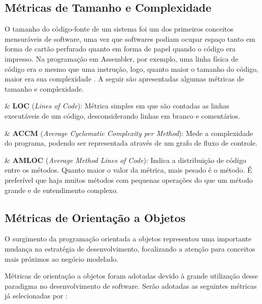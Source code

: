 \subsection{Métricas de Tamanho e Complexidade}

O tamanho do código-fonte de um sistema foi um dos primeiros conceitos mensuráveis de software, uma vez que softwares podiam ocupar espaço tanto em forma de cartão perfurado quanto em forma de papel quando o código era impresso. Na programação em Assembler, por exemplo, uma linha física de código era o mesmo que uma instrução, logo, quanto maior o tamanho do código, maior era sua complexidade \cite{metricsandmodels}. A seguir são apresentadas algumas métricas de tamanho e complexidade.

\begin{easylist}[itemize]

	& \textbf{LOC} (\textit{Lines of Code}): Métrica simples em que são contadas as linhas executáveis de um código, desconsiderando linhas em branco e comentários.  \cite{metricsandmodels} 
		
	& \textbf{ACCM} (\textit{Average Cyclomatic Complexity per Method}): Mede a complexidade do programa, podendo ser representada através de um grafo de fluxo de controle. \cite{McCabe76}

	& \textbf{AMLOC} (\textit{Average Method Lines of Code}): Indica a distribuição de código entre os métodos. Quanto maior o valor da métrica, mais pesado é o método. É preferível que haja muitos métodos com pequenas operações do que um método grande e de entendimento complexo. \cite{Meirelles2013}
	
\end{easylist}

\subsection{Métricas de Orientação a Objetos}

O surgimento da programação orientada a objetos representou uma importante mudança na estratégia de desenvolvimento, focalizando a atenção para conceitos mais próximos ao negócio modelado. \cite{phpmysql}  

Métricas de orientação a objetos foram adotadas devido à grande utilização desse paradigma no desenvolvimento de software. Serão adotadas as seguintes métricas já selecionadas por :  

